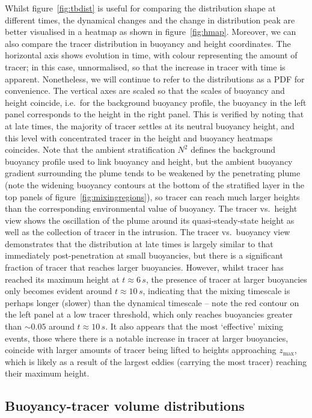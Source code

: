\documentclass[a4paper]{article}
\begin{document}
Whilst figure~\ref{fig:tbdist} is useful for comparing the distribution shape at different times, the
dynamical changes and the change in distribution peak are better visualised in a heatmap as shown in
figure~\ref{fig:hmap}.  Moreover, we can also compare the tracer distribution in buoyancy and height
coordinates. The horizontal axis shows evolution in time, with colour representing the amount of tracer; in
this case, unnormalised, so that the increase in tracer with time is apparent. Nonetheless, we will continue
to refer to the distributions as a PDF for convenience. The vertical axes are scaled so that the scales of
buoyancy and height coincide, i.e.\ for the background buoyancy profile, the buoyancy in the left panel
corresponds to the height in the right panel. This is verified by noting that at late times, the majority of
tracer settles at its neutral buoyancy height, and this level with concentrated tracer in the height and
buoyancy heatmaps coincides. Note that the ambient stratification $N^2$ defines the background buoyancy
profile used to link buoyancy and height, but the ambient buoyancy gradient surrounding the plume tends to be
weakened by the penetrating plume (note the widening buoyancy contours at the bottom of the stratified layer
in the top panels of figure~\ref{fig:mixingregions}), so tracer can reach much larger heights than the
corresponding environmental value of buoyancy. The tracer vs.\ height view shows the oscillation of the plume
around its quasi-steady-state height as well as the collection of tracer in the intrusion. The tracer vs.\
buoyancy view demonstrates that the distribution at late times is largely similar to that immediately
post-penetration at small buoyancies, but there is a significant fraction of tracer that reaches larger
buoyancies. However, whilst tracer has reached its maximum height at $t \approx 6 \, s$, the presence of
tracer at larger buoyancies only becomes evident around $t \approx 10\,s$, indicating that the mixing
timescale is perhaps longer (slower) than the dynamical timescale -- note the red contour on the left panel at
a low tracer threshold, which only reaches buoyancies greater than $\sim 0.05$ around $t \approx 10\,s$. It
also appears that the most `effective' mixing events, those where there is a notable increase in tracer at
larger buoyancies, coincide with larger amounts of tracer being lifted to heights approaching $z_{\max}$,
which is likely as a result of the largest eddies (carrying the most tracer) reaching their maximum height.

\subsection{Buoyancy-tracer volume distributions}
\end{document}
